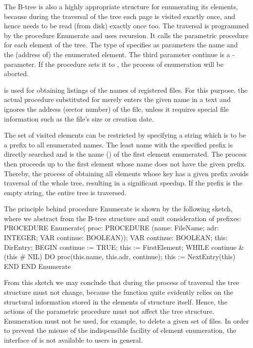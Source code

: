 \noindent The B-tree is also a highly appropriate structure for enumerating its elements, because during the traversal of the tree each page is visited exactly once, and hence needs to be read (from disk) exactly once too. The traversal is programmed by the procedure Enumerate and uses recursion. It calls the parametric procedure  for each element of the tree. The type of  specifies as parameters the name and the (address of) the enumerated element. The third parameter continue is a  -parameter. If the procedure sets it to , the process of enumeration will be aborted.

 is used for obtaining listings of the names of registered files. For this purpose, the actual procedure substituted for  merely enters the given name in a text and ignores the address (sector number) of the file, unless it requires special file information such as the file's size or creation date.

The set of visited elements can be restricted by specifying a string which is to be a prefix to all enumerated names. The least name with the specified prefix is directly searched and is the name () of the first element enumerated. The process then proceeds up to the first element whose name does not have the given prefix. Thereby, the process of obtaining all elements whose key has a given prefix avoids traversal of the whole tree, resulting in a significant speedup. If the prefix is the empty string, the entire tree is traversed.

The principle behind procedure Enumerate is shown by the following sketch, where we abstract from the B-tree structure and omit consideration of prefixes:
\begintt
PROCEDURE Enumerate(
proc: PROCEDURE (name: FileName; adr: INTEGER; VAR continue: BOOLEAN));
VAR continue: BOOLEAN; this: DirEntry; BEGIN continue := TRUE; this := FirstElement;
WHILE continue & (this # NIL) DO
proc(this.name, this.adr, continue); this := NextEntry(this)
END
END Enumerate
\endtt

\noindent From this sketch we may conclude that during the process of traversal the tree structure must not change, because the function  quite evidently relies on the structural information stored in the elements of structure itself. Hence, the actions of the parametric procedure must not affect the tree structure. Enumeration must not be used, for example, to delete a given set of files. In order to prevent the misuse of the indispensible facility of element enumeration, the interface of  is not available to users in general.

